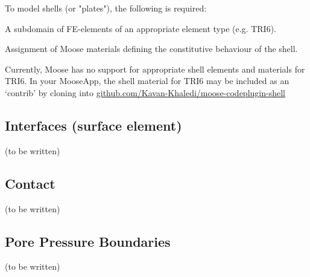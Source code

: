 To model shells (or "plates"), the following is required:

\begin{description}[font=$\bullet$~\normalfont]
    \item [subdomain:] A subdomain of FE-elements of an appropriate element type (e.g. TRI6).
    \item [materials:] Assignment of Moose materials defining the constitutive behaviour of the shell.
\end{description}

Currently, Moose has no support for appropriate shell elements and materials
for TRI6. In your MooseApp, the shell material for TRI6 may be included as an
‘contrib’ by cloning into
\href{https://github.com/Kavan-Khaledi/moose-codeplugin-shell}{github.com/Kavan-Khaledi/moose-codeplugin-shell}

\subsection{Interfaces (surface element)}

(to be written)

\subsection{Contact}

(to be written)

\subsection{Pore Pressure Boundaries}

(to be written)